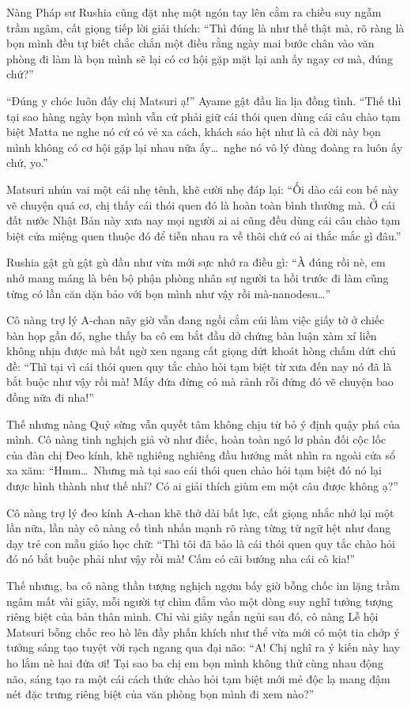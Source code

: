 \documentclass[../main.tex]{subfiles}
\begin{document}
Nàng Pháp sư Rushia cũng đặt nhẹ một ngón tay lên cằm ra chiều suy ngẫm trầm ngâm, cất giọng tiếp lời giải thích: ``Thì đúng là như thế thật mà, rõ ràng là bọn mình đều tự biết chắc chắn một điều rằng ngày mai bước chân vào văn phòng đi làm là bọn mình sẽ lại có cơ hội gặp mặt lại anh ấy ngay cơ mà, đúng chứ?''

``Đúng y chóc luôn đấy chị Matsuri ạ!'' Ayame gật đầu lia lịa đồng tình. ``Thế thì tại sao hàng ngày bọn mình vẫn cứ phải giữ cái thói quen dùng cái câu chào tạm biệt Matta ne nghe nó cứ có vẻ xa cách, khách sáo hệt như là cả đời này bọn mình không có cơ hội gặp lại nhau nữa ấy\dots\ nghe nó vô lý đùng đoàng ra luôn ấy chứ, yo.''

Matsuri nhún vai một cái nhẹ tênh, khẽ cười nhẹ đáp lại: ``Ối dào cái con bé này vẽ chuyện quá cơ, chị thấy cái thói quen đó là hoàn toàn bình thường mà. Ở cái đất nước Nhật Bản này xưa nay mọi người ai ai cũng đều dùng cái câu chào tạm biệt cửa miệng quen thuộc đó để tiễn nhau ra về thôi chứ có ai thắc mắc gì đâu.''

Rushia gật gù gật gù đầu như vừa mới sực nhớ ra điều gì: ``À đúng rồi nè, em nhớ mang máng là bên bộ phận phòng nhân sự người ta hồi trước đi làm cũng từng có lần căn dặn bảo với bọn mình như vậy rồi mà-nanodesu\dots''

Cô nàng trợ lý A-chan nãy giờ vẫn đang ngồi cắm cúi làm việc giấy tờ ở chiếc bàn họp gần đó, nghe thấy ba cô em bắt đầu dở chứng bàn luận xàm xí liền không nhịn được mà bất ngờ xen ngang cất giọng dứt khoát hòng chấm dứt chủ đề: ``Thì tại vì cái thói quen quy tắc chào hỏi tạm biệt từ xưa đến nay nó đã là bắt buộc như vậy rồi mà! Mấy đứa đừng có mà rảnh rỗi đứng đó vẽ chuyện bao đồng nữa đi nha!''

Thế nhưng nàng Quỷ sừng vẫn quyết tâm không chịu từ bỏ ý định quậy phá của mình. Cô nàng tinh nghịch giả vờ như điếc, hoàn toàn ngó lơ phản đối cộc lốc của đàn chị Đeo kính, khẽ nghiêng nghiêng đầu hướng mắt nhìn ra ngoài cửa sổ xa xăm: ``Hmm\dots\ Nhưng mà tại sao cái thói quen chào hỏi tạm biệt đó nó lại được hình thành như thế nhỉ? Có ai giải thích giùm em một câu được không ạ?''

Cô nàng trợ lý đeo kính A-chan khẽ thở dài bất lực, cất giọng nhắc nhở lại một lần nữa, lần này cô nàng cố tình nhấn mạnh rõ ràng từng từ ngữ hệt như đang dạy trẻ con mẫu giáo học chữ: ``Thì tôi đã bảo là cái thói quen quy tắc chào hỏi đó nó bắt buộc phải như vậy rồi mà! Cấm có cãi bướng nha cái cô kia!''

Thế nhưng, ba cô nàng thần tượng nghịch ngợm bấy giờ bỗng chốc im lặng trầm ngâm mất vài giây, mỗi người tự chìm đắm vào một dòng suy nghĩ tưởng tượng riêng biệt của bản thân mình. Chỉ vài giây ngắn ngủi sau đó, cô nàng Lễ hội Matsuri bỗng chốc reo hò lên đầy phấn khích như thể vừa mới có một tia chớp ý tưởng sáng tạo tuyệt vời rạch ngang qua đại não: ``A! Chị nghĩ ra ý kiến này hay ho lắm nè hai đứa ơi! Tại sao ba chị em bọn mình không thử cùng nhau động não, sáng tạo ra một cái cách thức chào hỏi tạm biệt mới mẻ độc lạ mang đậm nét đặc trưng riêng biệt của văn phòng bọn mình đi xem nào?''
\end{document}
